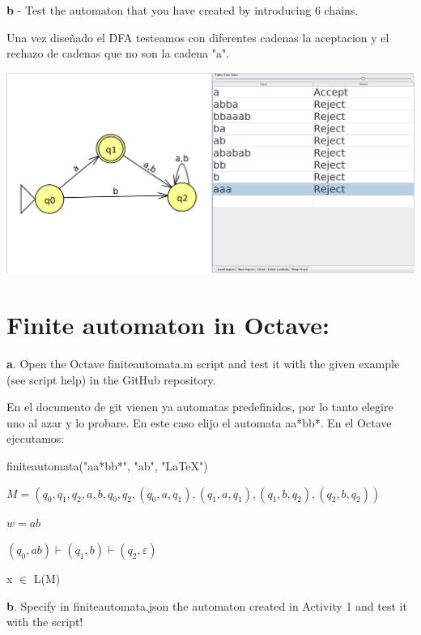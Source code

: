 \documentclass{article}
\begin{document}
\textbf b  - Test the automaton that you have created by introducing 6 chains.
	
	Una vez diseñado el DFA testeamos con diferentes cadenas la  aceptacion y el rechazo de cadenas que no son la cadena "a".
  
  \centering
	\includegraphics[scale=0.15]{DFA_P2_conTabla}
	
	
	
	

\flushleft
	















\section{Finite automaton in Octave:}

\textbf a. Open the Octave finiteautomata.m script and test it with the given example (see script help) in the GitHub repository.

En el documento de git vienen ya automatas predefinidos, por lo tanto elegire uno al azar y lo probare.
En este caso elijo el automata aa*bb*.
En el Octave ejecutamos:

\centering
finiteautomata("aa*bb*", "ab", "LaTeX")
\flushleft

$M = ( {q_0, q_1, q_2}, {a, b}, q_0, {q_2}, {(q_0, a, q_1), (q_1, a, q_1), (q_1, b, q_2), (q_2, b, q_2)} )$

$w = ab$

$(q_0, ab) \vdash (q_1, b) \vdash (q_2, \varepsilon)$

x $\in$ L(M)


\textbf b. Specify in finiteautomata.json the  automaton created in Activity 1 and test it with the script!
\end{document}
